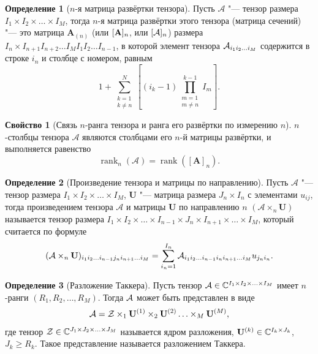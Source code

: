 \documentclass[specialist,
    substylefile = spbu.rtx,
    subf,href,colorlinks=true, 12pt]{disser}
\theoremstyle{plain}
\theoremstyle{definition}
\newtheorem{definition}{Определение}[section]
\newtheorem{property}{Свойство}[section]
\theoremstyle{remark}
\begin{document}
    \begin{definition}[$n$-я матрица развёртки тензора]
        Пусть $\mathcal{A}$ "--- тензор размера \linebreak $I_1\times I_2\times\ldots\times I_M$, тогда $n$-я матрица 
        развёртки этого тензора (матрица сечений) "--- это матрица $\mathbf{A}_{(n)}$ (или $[\mathbf{A}]_n$, или $[\mathcal{A}]_n$)
        размера $I_n\times I_{n+1}I_{n+2}\ldots I_{M}I_{1}I_{2}\ldots I_{n-1}$,
        в которой элемент тензора $\mathcal{A}_{i_1 i_2\ldots i_M}$ содержится в строке $i_n$ и столбце с номером, равным
        \[
            1 + \sum_{\substack{k = 1 \\ k \ne n}}^{N} \left[(i_k - 1) 
            \prod_{\substack{m=1 \\ m\ne n}}^{k-1} I_m\right].
        \]
    \end{definition}
    
    \begin{property}
        [Связь $n$-ранга тензора и ранга его развёртки по измерению $n$]
        $n$-столбцы тензора $\mathcal{A}$ являются столбцами его $n$-й матрицы развёртки, и выполняется равенство
        \[
            \operatorname{rank}_{n}(\mathcal{A})=\operatorname{rank}\left(\left[\mathbf{A}\right]_n\right).
        \]
    \end{property}
    
    \begin{definition}[Произведение тензора и матрицы по направлению]
        Пусть $\mathcal A$ "--- тензор размера $I_1\times I_2\times\ldots\times I_M$, $\mathbf U$
        "--- матрица размера $J_n\times I_n$ с элементами $u_{ij}$, 
        тогда произведением тензора $\mathcal{A}$ и матрицы $\mathbf{U}$ по
        направлению $n$ $(\mathcal{A}\times_n \mathbf U)$ называется тензор размера
        $I_1\times I_2\times\ldots\times I_{n-1} \times J_n\times I_{n+1}\times \ldots\times I_M$,
        который считается по формуле
        \[
            (\mathcal{A}\times_n \mathbf U)_{i_1 i_2\ldots i_{n-1}j_n i_{n+1}\ldots i_M} = 
            \sum_{i_n=1}^{I_n} \mathcal{A}_{i_1 i_2\ldots i_{n-1}i_n i_{n+1} \ldots i_M} u_{j_n i_n}.
        \]
    \end{definition}
    
    \begin{definition}[Разложение Таккера]
        Пусть тензор $\mathcal{A} \in \mathbb{C}^{I_1 \times I_2 \times \ldots \times I_M}$ имеет $n$-ранги
        $(R_1, R_2, \ldots, R_M)$.
        Тогда $\mathcal{A}$ может быть представлен в виде
        \begin{equation}
            \label{eq:tucker-decomp}
            \mathcal{A} = \mathcal{Z} \times_1 \mathbf{U}^{(1)} \times_2 \mathbf{U}^{(2)} \ldots \times_M \mathbf{U}^{(M)},
        \end{equation}
        где тензор $\mathcal{Z} \in \mathbb{C}^{J_1 \times J_2 \times \ldots \times J_M}$ называется ядром разложения,
        $\mathbf{U}^{(k)} \in \mathbb{C}^{I_k \times J_k}$, $J_k \geqslant R_k$.
        Такое представление называется разложением Таккера. 
    \end{definition}
    
\end{document}

